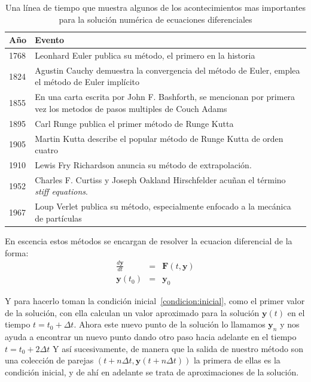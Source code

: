 \begin{table}
\begin{center}
\begin{tabular} {@{}lp{12cm}@{}} 
\toprule
Año & Evento \\ 
\midrule
1768 & Leonhard Euler publica su método, el primero en la historia \\
1824 & Agustin Cauchy demuestra la convergencia del método de Euler, emplea el método de Euler implícito \\
1855 & En una carta escrita por John F. Bashforth, se mencionan por primera vez los metodos de pasos multiples de Couch Adams \\
1895 & Carl Runge publica el primer método de Runge Kutta \\ 
1905 & Martin Kutta describe el popular método de Runge Kutta de orden cuatro \\ 
1910 & Lewis Fry Richardson anuncia su método de extrapolación. \\
1952 & Charles F. Curtiss y Joseph Oakland Hirschfelder acuñan el término \emph{\foreignlanguage{english}{stiff equations}}. \\
1967 & Loup Verlet publica su método, especialmente enfocado a la mecánica de partículas \\ 
\bottomrule
\end{tabular}
\end{center}
\caption[Evolución histórica de los métodos numéricos]{Una línea de tiempo que muestra algunos de los acontecimientos mas importantes para la solución numérica de ecuaciones diferenciales}
\label{historia:metodos}
\end{table}

En escencia estos métodos se encargan de resolver la ecuacion diferencial de la forma:
\begin{eqnarray}
 \frac{d\textbf{y}}{dt} & = &\textbf{F}(t,\textbf{y}) \nonumber \\
 \textbf{y}(t_0) & = & \textbf{y}_0 \label{condicion:inicial}
\end{eqnarray}

Y para hacerlo toman la condición inicial~\eqref{condicion:inicial}, como el primer valor de la solución, con ella calculan un valor aproximado para la solución $\textbf{y}(t)$ en el tiempo $t = t_0 + \Delta t$.
Ahora este nuevo punto de la solución lo llamamos $\textbf{y}_{n}$ y nos ayuda a encontrar un nuevo punto dando otro paso hacia adelante en el tiempo $t = t_0 + 2\Delta t$
Y así sucesivamente, de manera que la salida de nuestro método son una colección de parejas $(t + n \Delta t, \textbf{y}(t + n \Delta t) )$ la primera de ellas es la condición inicial, y de ahí en adelante se trata de aproximaciones de la solución.


